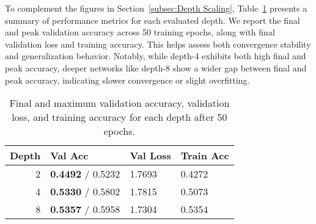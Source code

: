 To complement the figures in Section~\ref{subsec:Depth Scaling}, Table~\ref{tab:depth_summary} presents a summary of performance metrics for each evaluated depth. 
We report the final and peak validation accuracy across 50 training epochs, along with final validation loss and training accuracy. 
This helps assess both convergence stability and generalization behavior. 
Notably, while depth-4 exhibits both high final and peak accuracy, deeper networks like depth-8 show a wider gap between final and peak accuracy, indicating slower convergence or slight overfitting.

\begin{table}[H]
\centering
\caption{Final and maximum validation accuracy, validation loss, and training accuracy for each depth after 50 epochs.}
\label{tab:depth_summary}
\begin{tabular}{rlll}
\toprule
 Depth &                  Val Acc & Val Loss & Train Acc \\
\midrule
     2 & \textbf{0.4492} / 0.5232 &   1.7693 &    0.4272 \\
     4 & \textbf{0.5330} / 0.5802 &   1.7815 &    0.5073 \\
     8 & \textbf{0.5357} / 0.5958 &   1.7304 &    0.5354 \\
\bottomrule
\end{tabular}
\end{table}

